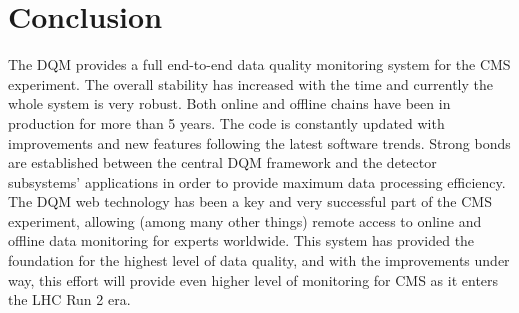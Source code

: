 \documentclass[journal]{IEEEtran}
\begin{document}



\section{Conclusion}
The DQM provides a full end-to-end data quality monitoring system for the CMS experiment. The overall stability has increased with the time and currently the whole system is very robust. Both online and offline chains have been in production for more than 5 years. The code is constantly updated with improvements and new features following the latest software trends. Strong bonds are established between the central DQM framework and the detector subsystems’ applications in order to provide maximum data processing efficiency. The DQM web technology has been a key and very successful part of the CMS experiment, allowing (among many other things) remote access to online and offline data monitoring for experts worldwide. This system has provided the foundation for the highest level of data quality, and with the improvements under way, this effort will provide even higher level of monitoring for CMS as it enters the LHC Run 2 era.



%
\end{document}
